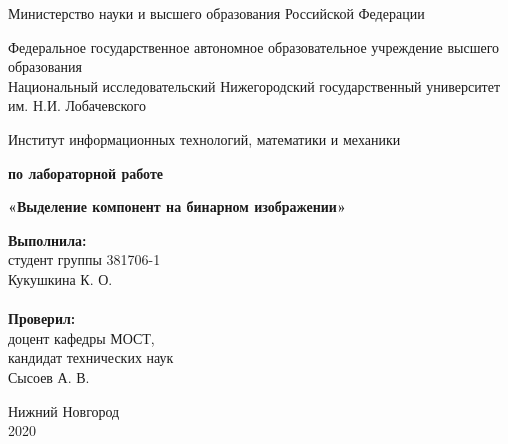 \documentclass{report}
\begin{document}
\begin{titlepage}

\begin{center}
Министерство науки и высшего образования Российской Федерации
\end{center}

\begin{center}
Федеральное государственное автономное образовательное учреждение высшего образования \\
Национальный исследовательский Нижегородский государственный университет им. Н.И. Лобачевского
\end{center}

\begin{center}
Институт информационных технологий, математики и механики
\end{center}

\vspace{4em}

\begin{center}
\textbf{ по лабораторной работе} \\
\end{center}
\begin{center}
\textbf{\Large«Выделение компонент на бинарном изображении»} \\
\end{center}

\vspace{4em}

\newbox{\lbox}
\newlength{\maxl}
\setlength{\maxl}{\wd\lbox}
\hfill\parbox{7cm}{
\hspace*{5cm}\hspace*{-5cm}\textbf{Выполнила:} \\ студент группы 381706-1 \\ Кукушкина К. О.\\
\\
\hspace*{5cm}\hspace*{-5cm}\textbf{Проверил:}\\ доцент кафедры МОСТ, \\ кандидат технических наук \\ Сысоев А. В.
}

\vspace{\fill}

\begin{center} Нижний Новгород \\ 2020 \end{center}

\end{titlepage}
\end{document}
